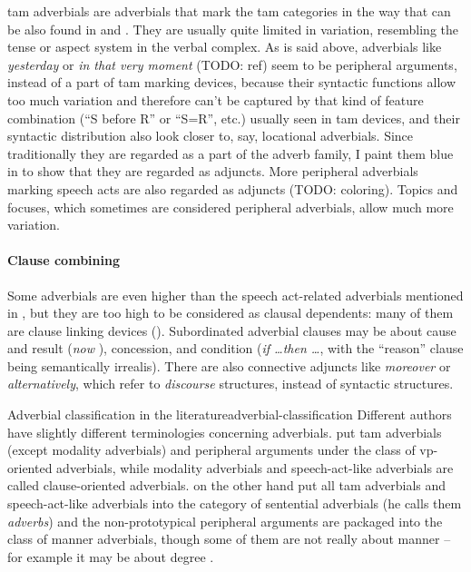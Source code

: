 \documentclass[UTF8, a4paper, oneside, scheme=plain, 12pt]{ctexbook}
\newcommand*{\citepage}[1]{p.~{#1}}
\newcommand*{\term}[1]{\emph{#1}}
\newcommand{\form}[1]{\emph{#1}}
\begin{document}
\acs{tam} adverbials are adverbials that mark the \acs{tam} categories 
in the way that can be also found in 
and .
They are usually quite limited in variation,
resembling the tense or aspect system in the verbal complex.
As is said above, adverbials like \form{yesterday} or \form{in that very moment} (TODO: ref)
seem to be peripheral arguments, instead of a part of \acs{tam} marking devices,
because their syntactic functions allow too much variation 
and therefore can't be captured by that kind of feature combination 
(``S before R'' or ``S=R'', etc.)
usually seen in \acs{tam} devices,
and their syntactic distribution also look closer to, say, locational adverbials.
Since traditionally they are regarded as a part of the adverb family, 
I paint them blue in  to show that they are regarded as adjuncts.
More peripheral adverbials marking speech acts are also regarded as adjuncts (TODO: coloring).
Topics and focuses, which sometimes are considered peripheral adverbials,
allow much more variation. 

\paragraph*{Clause combining}

Some adverbials are even higher than the speech act-related adverbials 
mentioned in ,
but they are too high to be considered as clausal dependents:
many of them are clause linking devices ().
Subordinated adverbial clauses may be about 
cause and result (\form{now }), 
concession, 
and condition (\form{if \dots then \dots}, with the ``reason'' clause being semantically irrealis).
There are also connective adjuncts like \form{moreover} or \form{alternatively},
which refer to \emph{discourse} structures, instead of syntactic structures.



\begin{infobox}{Adverbial classification in the literature}{adverbial-classification}
    Different authors have slightly different terminologies concerning adverbials.
    \citet[\citepage{576}]{cgel} put \acs{tam} adverbials (except modality adverbials) 
    and peripheral arguments
    under the class of \acs{vp}-oriented adverbials, 
    while modality adverbials and speech-act-like adverbials are called clause-oriented adverbials.
    \citet[\citepage{386}]{dixon2005semantic} on the other hand 
    put all \acs{tam} adverbials and speech-act-like adverbials 
    into the category of sentential adverbials (he calls them \term{adverbs})
    and the non-prototypical peripheral arguments are packaged into the class of manner adverbials,
    though some of them are not really about manner -- 
    for example it may be about degree \citet[\citepage{576}]{cgel}.
\end{infobox}
\end{document}
